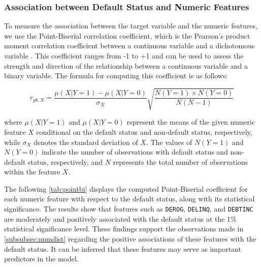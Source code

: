 \subsubsection{Association between Default Status and Numeric Features}
\label{subsubsec:target-num-ass}

To measure the association between the target variable and the numeric features, we use the Point-Biserial correlation coefficient, which is the Pearson's product moment correlation coefficient between a continuous variable and a dichotomous variable \citep{kornbrot2014point}.
This coefficient ranges from -1 to +1 and can be used to assess the strength and direction of the relationship between a continuous variable and a binary variable.
The formula for computing this coefficient is as follows:

\begin{equation}\label{eq}
r_{pb,X} =  \frac{\mu \left( X | Y=1 \right) -\mu \left( X | Y=0 \right)}{\sigma_{X}}\sqrt{\frac{N\left(Y=1\right) \times N\left(Y=0\right)}{N \left(N - 1 \right)}}
\end{equation}

where $\mu \left( X | Y=1 \right)$ and $\mu \left( X | Y=0 \right)$ represent the means of the given numeric feature $X$ conditional on the default status and non-default status, respectively, while $\sigma_{X}$ denotes the standard deviation of $X$.
The values of $N\left(Y=1\right)$ and $N\left(Y=0\right)$ indicate the number of observations with default status and non-default status, respectively, and $N$ represents the total number of observations within the feature $X$.


The following \autoref{tab:pointbi} displays the computed Point-Biserial coefficient for each numeric feature with respect to the default status, along with its statistical significance.
The results show that features such as \texttt{DEROG}, \texttt{DELINQ}, and \texttt{DEBTINC} are moderately and positively associated with the default status at the 1\% statistical significance level.
These findings support the observations made in \autoref{subsubsec:numdist} regarding the positive associations of these features with the default status. It can be inferred that these features may serve as important predictors in the model.

